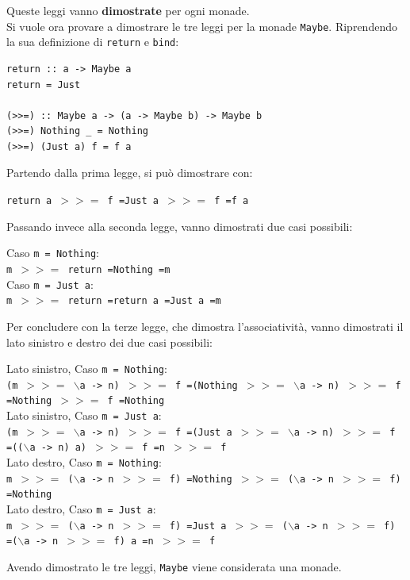 \documentclass{article}
\begin{document}
Queste leggi vanno \textbf{dimostrate} per ogni monade.\vspace{14pt}\\
Si vuole ora provare a dimostrare le tre leggi per la monade \texttt{Maybe}. Riprendendo la sua definizione di \texttt{return} e \texttt{bind}:
\begin{tcolorbox}
\begin{verbatim}
return :: a -> Maybe a
return = Just

(>>=) :: Maybe a -> (a -> Maybe b) -> Maybe b
(>>=) Nothing _ = Nothing
(>>=) (Just a) f = f a
\end{verbatim}
\end{tcolorbox}
Partendo dalla prima legge, si può dimostrare con:
\begin{center}
    \texttt{return a $>>=$ f \qquad=\qquad Just a $>>=$ f \qquad=\qquad f a}
\end{center}
Passando invece alla seconda legge, vanno dimostrati due casi possibili:
\begin{center}
    Caso \texttt{m = Nothing}:\\
    \texttt{m $>>=$ return \qquad=\qquad Nothing \qquad=\qquad m}\\
    Caso \texttt{m = Just a}:\\
    \texttt{m $>>=$ return \qquad=\qquad return a \qquad=\qquad Just a \qquad=\qquad m}
\end{center}
Per concludere con la terze legge, che dimostra l'associatività, vanno dimostrati il lato sinistro e destro dei due casi possibili:
\begin{center}
    Lato sinistro, Caso \texttt{m = Nothing}:\\
    \texttt{(m $>>=$ $\backslash$a -> n) $>>=$ f \qquad=\qquad (Nothing $>>=$ $\backslash$a -> n) $>>=$ f \\ \qquad=\qquad Nothing $>>=$ f \qquad=\qquad Nothing}\vspace{10pt}\\
    Lato sinistro, Caso \texttt{m = Just a}:\\
    \texttt{(m $>>=$ $\backslash$a -> n) $>>=$ f \qquad=\qquad (Just a $>>=$ $\backslash$a -> n) $>>=$ f \\ \qquad=\qquad (($\backslash$a -> n) a) $>>=$ f \qquad=\qquad n $>>=$ f}\vspace{14pt}\\
    Lato destro, Caso \texttt{m = Nothing}:\\
    \texttt{m $>>=$ ($\backslash$a -> n $>>=$ f) \qquad=\qquad Nothing $>>=$ ($\backslash$a -> n $>>=$ f) \\ \qquad=\qquad Nothing}\vspace{10pt}\\
    Lato destro, Caso \texttt{m = Just a}:\\
    \texttt{m $>>=$ ($\backslash$a -> n $>>=$ f) \qquad=\qquad Just a $>>=$ ($\backslash$a -> n $>>=$ f) \\ \qquad=\qquad ($\backslash$a -> n $>>=$ f) a \qquad=\qquad n $>>=$ f}
\end{center}
\vspace{8pt}
Avendo dimostrato le tre leggi, \texttt{Maybe} viene considerata una monade.
\end{document}
